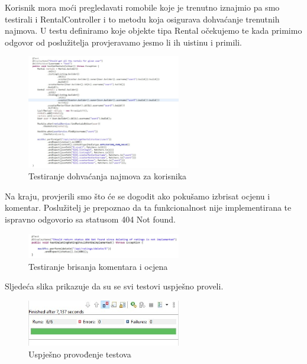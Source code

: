 			Korisnik mora moći pregledavati romobile koje je trenutno iznajmio pa smo testirali i RentalController i to metodu koja osigurava dohvaćanje trenutnih najmova. U testu definiramo koje objekte tipa Rental očekujemo te kada primimo odgovor od poslužitelja provjeravamo jesmo li ih uistinu i primili. \newline
			
			\begin{figure}[h]
				\centering
				\includegraphics[width=0.6\textwidth]{slike/rental_controller_test.jpg}
				\caption{Testiranje dohvaćanja najmova za korisnika}
				\label{fig:Testiranje dohvaćanja najmova za korisnika}
			\end{figure}
			
			Na kraju, provjerili smo što će se dogodit ako pokušamo izbrisat ocjenu i komentar. Poslužitelj je prepoznao da ta funkcionalnost nije implementirana te ispravno odgovorio sa statusom 404 Not found.\newline
			
			\begin{figure}[h]
				\centering
				\includegraphics[width=0.6\textwidth]{slike/rating_controller_test.jpg}
				\caption{Testiranje brisanja komentara i ocjena}
				\label{fig:Testiranje brisanja komentara i ocjena}
			\end{figure}
			
			Sljedeća slika prikazuje da su se svi testovi uspješno proveli.
			\begin{figure}[h]
				\centering
				\includegraphics[width=0.6\textwidth]{slike/tests_passed.jpg}
				\caption{Uspješno provođenje testova}
				\label{fig:Uspješno provođenje testova}
			\end{figure}
			
